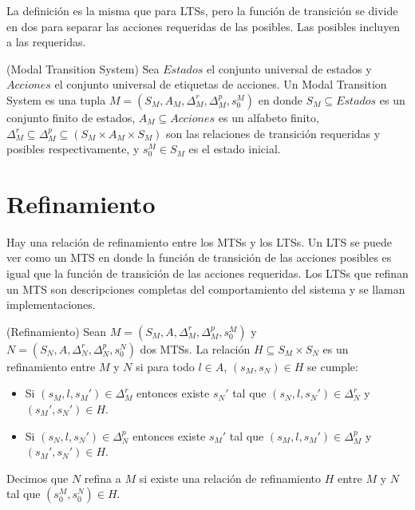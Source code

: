 \vspace{\baselineskip}
La definición es la misma que para LTSs, pero la función de transición se divide en dos para separar las acciones 
requeridas de las posibles. Las posibles incluyen a las requeridas.

\begin{definition}{(Modal Transition System)}
Sea $Estados$ el conjunto universal de estados y $Acciones$ el conjunto universal de etiquetas de acciones. Un Modal 
Transition System es una tupla $M = (S_{M}, A_{M}, \Delta_{M}^{r}, \Delta_{M}^{p}, s_{0}^{M})$ en donde $S_{M} \subseteq Estados$ 
es un conjunto finito de estados, $A_{M} \subseteq Acciones$ es un alfabeto finito, 
$\Delta_{M}^{r} \subseteq \Delta_{M}^{p} \subseteq (S_{M} \times A_{M} \times S_{M})$ son las relaciones de transición requeridas 
y posibles respectivamente, y $s_{0}^{M} \in S_{M}$ es el estado inicial.
\end{definition}

\section{Refinamiento}
Hay una relación de refinamiento entre los MTSs y los LTSs. Un LTS se puede ver como un MTS en donde la función de 
transición de las acciones posibles es igual que la función de transición de las acciones requeridas. Los LTSs que 
refinan un MTS son descripciones completas del comportamiento del sistema y se llaman implementaciones.

\begin{definition}{(Refinamiento)}
Sean $M = (S_{M}, A, \Delta_{M}^{r}, \Delta_{M}^{p}, s_{0}^{M})$ y\\
$N = (S_{N}, A, \Delta_{N}^{r}, \Delta_{N}^{p}, s_{0}^{N})$ dos MTSs. La relación $H \subseteq S_{M} \times S_{N}$ es un refinamiento 
entre $M$ y $N$ si para todo $l \in A$, $(s_{M}, s_{N}) \in H$ se cumple:

\begin{itemize}

\item
Si $(s_{M}, l, s_{M}') \in \Delta_{M}^{r}$ entonces existe $s_{N}'$ tal que $(s_{N}, l, s_{N}') \in \Delta_{N}^{r}$ y $(s_{M}', s_{N}') \in H$.

\item
Si $(s_{N}, l, s_{N}') \in \Delta_{N}^{p}$ entonces existe $s_{M}'$ tal que $(s_{M}, l, s_{M}') \in \Delta_{M}^{p}$ y $(s_{M}', s_{N}') \in H$.

\end{itemize}

Decimos que $N$ refina a $M$ si existe una relación de refinamiento $H$ entre $M$ y $N$ tal que $(s_{0}^{M}, s_{0}^{N}) \in H$.

\end{definition}

